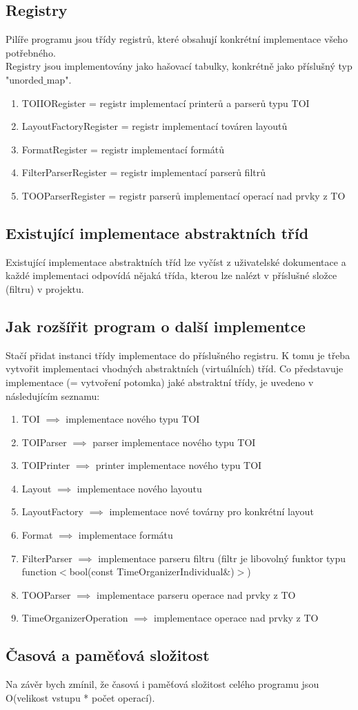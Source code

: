 \documentclass[11pt]{article}
\begin{document}
\subsection{Registry}
Pilíře programu jsou třídy registrů, které obsahují konkrétní implementace všeho potřebného.\\
Registry jsou implementovány jako hašovací tabulky, konkrétně jako příslušný typ "unorded$\_$map".
\begin{enumerate}[leftmargin=5mm]
\item TOIIORegister = registr implementací printerů a parserů typu TOI
\item LayoutFactoryRegister = registr implementací továren layoutů
\item FormatRegister = registr implementací formátů
\item FilterParserRegister = registr implementací parserů filtrů
\item TOOParserRegister = registr parserů implementací operací nad prvky z TO
\end{enumerate}
\subsection{Existující implementace abstraktních tříd}
Existující implementace abstraktních tříd lze vyčíst z uživatelské dokumentace a každé implementaci odpovídá nějaká třída, kterou lze nalézt v příslušné složce (filtru) v projektu.
\subsection{Jak rozšířit program o další implementce}
Stačí přidat instanci třídy implementace do příslušného registru.
K tomu je třeba vytvořit implementaci vhodných abstraktních (virtuálních) tříd.
Co představuje implementace (= vytvoření potomka) jaké abstraktní třídy, je uvedeno v následujícím seznamu:
\begin{enumerate}[leftmargin=5mm]
\item TOI $\implies$ implementace nového typu TOI
\item TOIParser $\implies$ parser implementace nového typu TOI
\item TOIPrinter $\implies$ printer implementace nového typu TOI
\item Layout $\implies$ implementace nového layoutu
\item LayoutFactory $\implies$ implementace nové továrny pro konkrétní layout
\item Format $\implies$ implementace formátu
\item FilterParser $\implies$ implementace parseru filtru (filtr je libovolný funktor typu function$<$bool(const TimeOrganizerIndividual\&)$>$)
\item TOOParser $\implies$ implementace parseru operace nad prvky z TO
\item TimeOrganizerOperation $\implies$ implementace operace nad prvky z TO
\end{enumerate}
\subsection{Časová a paměťová složitost}
Na závěr bych zmínil, že časová i paměťová složitost celého programu jsou O(velikost vstupu * počet operací).
\end{document}
